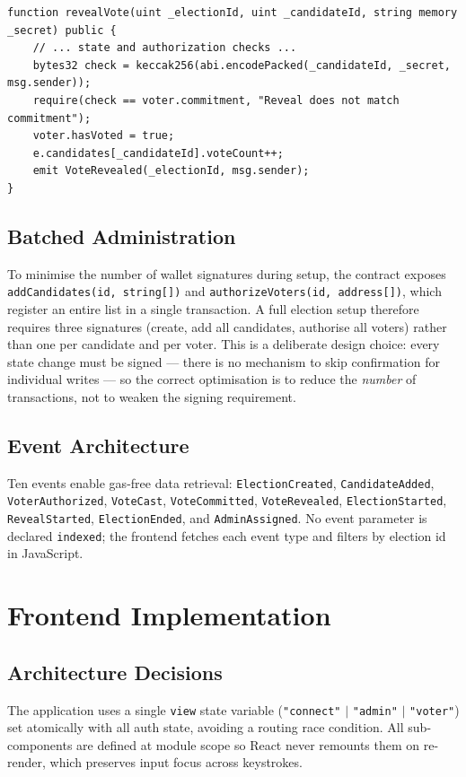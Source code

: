 \documentclass[11pt]{article}
\begin{document}
\begin{lstlisting}[language=Solidity]
function revealVote(uint _electionId, uint _candidateId, string memory _secret) public {
    // ... state and authorization checks ...
    bytes32 check = keccak256(abi.encodePacked(_candidateId, _secret, msg.sender));
    require(check == voter.commitment, "Reveal does not match commitment");
    voter.hasVoted = true;
    e.candidates[_candidateId].voteCount++;
    emit VoteRevealed(_electionId, msg.sender);
}
\end{lstlisting}

\subsection{Batched Administration}
To minimise the number of wallet signatures during setup, the contract exposes
\texttt{addCandidates(id, string[])} and \texttt{authorizeVoters(id, address[])}, which
register an entire list in a single transaction. A full election setup therefore requires
three signatures (create, add all candidates, authorise all voters) rather than one per
candidate and per voter. This is a deliberate design choice: every state change must be
signed --- there is no mechanism to skip confirmation for individual writes --- so the
correct optimisation is to reduce the \emph{number} of transactions, not to weaken the
signing requirement.

\subsection{Event Architecture}
Ten events enable gas-free data retrieval: \texttt{ElectionCreated},
\texttt{CandidateAdded}, \texttt{VoterAuthorized}, \texttt{VoteCast},
\texttt{VoteCommitted}, \texttt{VoteRevealed}, \texttt{ElectionStarted},
\texttt{RevealStarted}, \texttt{ElectionEnded}, and \texttt{AdminAssigned}. No event
parameter is declared \texttt{indexed}; the frontend fetches each event type and filters by
election id in JavaScript.

\section{Frontend Implementation}

\subsection{Architecture Decisions}
The application uses a single \texttt{view} state variable
(\texttt{"connect"} $|$ \texttt{"admin"} $|$ \texttt{"voter"}) set atomically with all auth
state, avoiding a routing race condition. All sub-components are defined at module scope so
React never remounts them on re-render, which preserves input focus across keystrokes.
\end{document}
